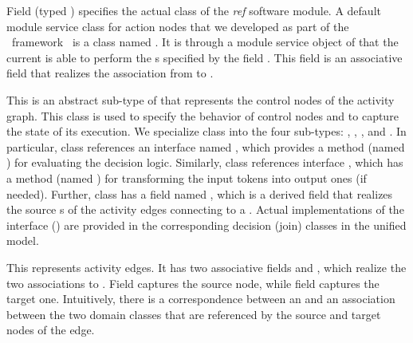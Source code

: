 \begin{description}
%
Field  (typed ) specifies the actual  class of the \textit{ref} software module. 
A default module service class for action nodes that we developed as part of the \jdomainapp~framework~\cite{le_jdomainapp_2017} is a class named .
It is through a module service object of  that the current  is able to perform the s specified by the field . This field is an associative field that realizes the association from  to .
%
\item[\clazz{ControlNode}.] This is an abstract sub-type of  that represents the control nodes of the activity graph. This class is used to specify the behavior of control nodes and to capture the state of its execution. We specialize class  into the four sub-types: , , , and . 
In particular, class  references an interface named , which provides a method (named ) for evaluating the decision logic. Similarly, class  references interface , which has a method (named ) for transforming the input tokens into output ones (if needed).
Further, class  has a field named , which is a derived field that realizes the source s of the activity edges connecting to a .
%
Actual implementations of the interface  () are provided in the corresponding decision (join) classes in the unified model.
%
\item[\clazz{Edge}.] This represents activity edges. It has two associative fields  and , which realize the two associations to . Field  captures the source node, while field  captures the target one. Intuitively, there is a correspondence between an  and an association between the two domain classes that are referenced by the source and target nodes of the edge.
\end{description}

